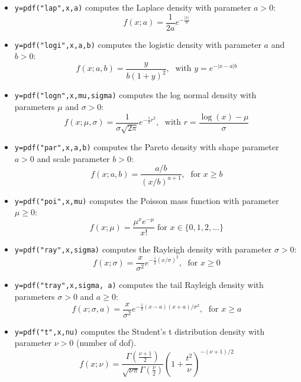 \begin{mandescription}
\begin{itemize}
\item {} \verb!y=pdf("lap",x,a)! computes the Laplace
  density with parameter $a > 0$:
$$
     f(x; a) = \frac{1}{2a} e^{-\frac{|x|}{a}}
$$

\item {} \verb!y=pdf("logi",x,a,b)! computes the logistic
  density with parameter $a$ and $b > 0$:
$$
     f(x; a,b) = \frac{y}{b (1+y)^2}, \; \mbox{ with } y = e^{-{|x-a|}{b}}
$$


\item {} \verb!y=pdf("logn",x,mu,sigma)! computes
  the log normal density with parameters $\mu$ and $\sigma > 0$:
$$
     f(x; \mu, \sigma) = \frac{ 1 }{ \sigma \sqrt{2\pi}}
     e^{-\frac{1}{2} r^2 }, \; \mbox{ with } r = \frac{\log(x)-\mu}{\sigma}
$$


\item {} \verb!y=pdf("par",x,a,b)! computes the Pareto
  density with shape parameter $a > 0$ and scale parameter $b > 0$:
$$
     f(x; a, b) = \frac{ a/b }{ (x/b)^{a+1} }, \; \mbox{ for } x \ge b
$$


\item {} \verb!y=pdf("poi",x,mu)! computes
  the Poisson mass function with parameter $\mu \ge 0$:
$$
     f(x; \mu) = \frac{\mu^x e^{-\mu}}{x!} \;\mbox{for } x \in \{0, 1, 2, \dots\}
$$

\item {} \verb!y=pdf("ray",x,sigma)! computes the Rayleigh
  density with parameter $\sigma > 0$:
$$
     f(x; \sigma) = \frac{x}{\sigma^2} e^{-\frac{1}{2} (x/\sigma)^2 }, \; \mbox{ for } x \ge 0
$$

\item {} \verb!y=pdf("tray",x,sigma, a)! computes
  the tail Rayleigh density with parameters $\sigma > 0$ and $a \ge 0$:
$$
     f(x; \sigma, a) = \frac{x}{\sigma^2} e^{-\frac{1}{2} (x-a)(x+a)/\sigma^2 }, \; \mbox{ for } x \ge a
$$


\item {} \verb!y=pdf("t",x,nu)! computes
  the Student's t distribution density with parameter $\nu > 0$
  (number of dof).
$$
    f(x; \nu) = \frac{\Gamma(\frac{\nu+1}{2})}{\sqrt{\nu \pi}\Gamma(\frac{\nu}{2})} \left( 1 + \frac{t^2}{\nu} \right)^{-(\nu+1)/2} 
$$



\end{itemize}
\end{mandescription}
